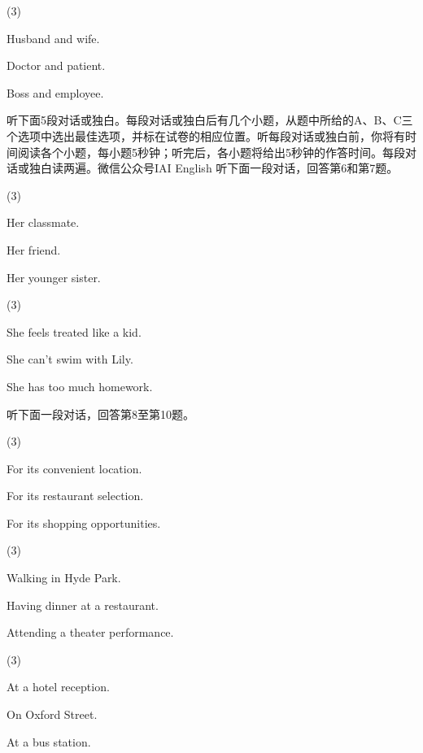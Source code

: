 \documentclass{英语试卷}
\begin{document}
\begin{choices}(3)
  \item Husband and wife.
  \item Doctor and patient.
  \item Boss and employee.
\end{choices}
\par 听下面5段对话或独白。每段对话或独白后有几个小题，从题中所给的A、B、C三个选项中选出最佳选项，并标在试卷的相应位置。听每段对话或独白前，你将有时间阅读各个小题，每小题5秒钟；听完后，各小题将给出5秒钟的作答时间。每段对话或独白读两遍。微信公众号IAI English 听下面一段对话，回答第6和第7题。\par
{}
\begin{choices}(3)
  \item Her classmate.
  \item Her friend.
  \item Her younger sister.
\end{choices}
\begin{choices}(3)
  \item She feels treated like a kid.
  \item She can't swim with Lily.
  \item She has too much homework.
\end{choices}
\par 听下面一段对话，回答第8至第10题。\par
{}
\begin{choices}(3)
  \item For its convenient location.
  \item For its restaurant selection.
  \item For its shopping opportunities.
\end{choices}
\begin{choices}(3)
  \item Walking in Hyde Park.
  \item Having dinner at a restaurant.
  \item Attending a theater performance.
\end{choices}
\begin{choices}(3)
  \item At a hotel reception.
  \item On Oxford Street.
  \item At a bus station.
\end{choices}
\end{document}
